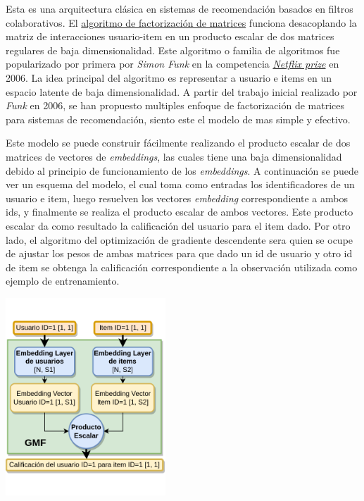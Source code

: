 \documentclass[11pt,a4paper,twoside]{thesis}
\begin{document}
Esta es una arquitectura clásica en sistemas de recomendación basados en filtros colaborativos. El \href{https://sifter.org/~simon/journal/20061211.html}{algoritmo de factorización de matrices} funciona desacoplando la matriz de interacciones usuario-item en un producto escalar de dos matrices regulares de baja dimensionalidad. Este algoritmo o familia de algoritmos fue popularizado por primera por \textit{Simon Funk} en la competencia \href{https://en.wikipedia.org/wiki/Netflix_Prize}{\textit{Netflix prize}} en 2006. La idea principal del algoritmo es representar a usuario e items en un espacio latente de baja dimensionalidad.
A partir del trabajo inicial realizado por  \textit{Funk} en 2006, se han propuesto multiples enfoque de factorización de matrices para sistemas de recomendación, siento este el modelo de mas simple y efectivo.

Este modelo se puede construir fácilmente realizando el producto escalar de dos matrices de vectores de \textit{embeddings}, las cuales tiene una baja dimensionalidad debido al principio de funcionamiento de los \textit{embeddings}. A continuación se puede ver un esquema del modelo, el cual toma como entradas los identificadores de un usuario e item, luego resuelven los vectores \textit{embedding} correspondiente a ambos ids, y finalmente se realiza el producto escalar de ambos vectores. Este producto escalar da como resultado la calificación del usuario para el item dado. Por otro lado, el algoritmo del optimización de gradiente descendente sera quien se ocupe de ajustar los pesos de ambas matrices para que dado un id de usuario y otro id de item se obtenga la calificación correspondiente a la observación utilizada como ejemplo de entrenamiento.

\begin{center}
	\includegraphics[width=6cm]{./images/GMF.png}
\end{center}
\end{document}
